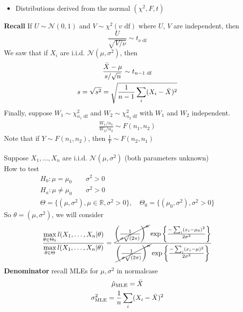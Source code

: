 \begin{itemize}
	\item Distributions derived from the normal $(\chi^2, F, t)$
\end{itemize}

\textbf{Recall} If $U \sim \mathcal{N}(0,1)$ and $V \sim \chi^2(v \text{ df})$ where $U$, $V$ are independent, then
\begin{equation*}
	\frac{U}{\sqrt{V / \nu}}\sim t_{\nu \text{ df}}
\end{equation*}
We saw that if $X_i$ are i.i.d. $\mathcal{N}(\mu, \sigma^2)$, then 
\begin{gather*}
	\frac{\bar{X} - \mu}{s / \sqrt{n}} \sim t_{n-1 \text{ df}}\\
	s = \sqrt{s^2} = \sqrt{\frac{1}{n-1} \sum_i (X_i - \bar{X})^2}
\end{gather*}
Finally, suppose $W_1 \sim \chi^2_{n_1 \text{ df}}$ and $W_2 \sim \chi^2_{n_2 \text{ df}}$ with $W_1$ and $W_2$ independent.
\begin{gather*}
	\frac{W_1/n_1}{W_2/n_2} \sim F(n_1, n_2)
\end{gather*}
Note that if $Y \sim F(n_1, n_2)$, then $\frac{1}{Y} \sim F(n_2, n_1)$\\\\
Suppose $X_1, \ldots, X_n$ are i.i.d. $\mathcal{N}(\mu, \sigma^2)$ (both parameters unknown)\\
How to test
\begin{gather*}
	H_0: \mu = \mu_0 \qquad \sigma^2 > 0\\
	H_a: \mu \neq \mu_0 \qquad \sigma^2 > 0\\
	\Theta = \{ (\mu, \sigma^2), \mu \in \mathbb{R}, \sigma^2 > 0 \}, \quad 	\Theta_0 = \{ (\mu_0, \sigma^2), \sigma^2 > 0 \}
\end{gather*}
So $\theta = (\mu, \sigma^2)$, we will consider
\begin{gather*}
	\frac{\max\limits_{\theta \in \Theta_0} l(X_1, \ldots, X_n | \theta) }{\max\limits_{\theta \in \Theta} l(X_1, \ldots, X_n | \theta) }  = \frac{\cancel{\bigg( \frac{1}{\sigma\sqrt(2\pi)} \bigg)^n} \exp \bigg\{ \frac{-\sum_i (x_i - \mu_0)^2}{2\sigma^2} \bigg\} }{\cancel{\bigg( \frac{1}{\sigma\sqrt(2\pi)} \bigg)^n} \exp \bigg\{ \frac{-\sum_i (x_i - \mu)^2}{2\sigma^2} \bigg\} }
\end{gather*}
\textbf{Denominator} recall MLEs for $\mu, \sigma^2$ in normalcase
\begin{gather*}
	\hat{\mu}_{\text{MLE}} = \bar{X}\\
	\sigma^2_{\text{MLE}} = \frac{1}{n}\sum_i (X_i - \bar{X})^2
\end{gather*}
